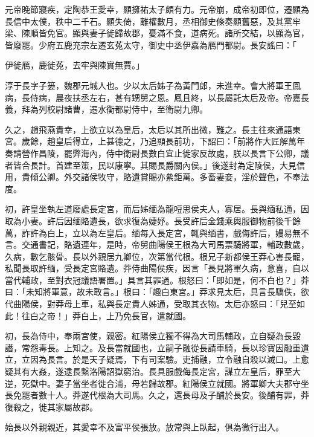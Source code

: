 \begin{pinyinscope}
元帝晚節寢疾，定陶恭王愛幸，顯擁祐太子頗有力。元帝崩，成帝初即位，遷顯為長信中太僕，秩中二千石。顯失倚，離權數月，丞相御史條奏顯舊惡，及其黨牢梁、陳順皆免官。顯與妻子徙歸故郡，憂滿不食，道病死。諸所交結，以顯為官，皆廢罷。少府五鹿充宗左遷玄菟太守，御史中丞伊嘉為鴈門都尉。長安謠曰：「

伊徙鴈，鹿徙菟，去牢與陳實無賈。」

淳于長字子篓，魏郡元城人也。少以太后姊子為黃門郎，未進幸。會大將軍王鳳病，長侍病，晨夜扶丞左右，甚有甥舅之恩。鳳且終，以長屬託太后及帝。帝嘉長義，拜為列校尉諸曹，遷水衡都尉侍中，至衛尉九卿。

久之，趙飛燕貴幸，上欲立以為皇后，太后以其所出微，難之。長主往來通語東宮。歲餘，趙皇后得立，上甚德之，乃追顯長前功，下詔曰：「前將作大匠解萬年奏請營作昌陵，罷弊海內，侍中衛尉長數白宜止徙家反故處，朕以長言下公卿，議者皆合長計。首建至策，民以康寧。其賜長爵關內侯。」後遂封為定陵侯，大見信用，貴傾公卿。外交諸侯牧守，賂遺賞賜亦絫鉅萬。多畜妻妾，淫於聲色，不奉法度。

初，許皇坐執左道廢處長定宮，而后姊缅為龍哣思侯夫人，寡居。長與缅私通，因取為小妻。許后因缅賂遺長，欲求復為婕妤。長受許后金錢乘輿服御物前後千餘萬，詐許為白上，立以為左皇后。缅每入長定宮，輒與缅書，戲侮許后，嫚易無不言。交通書記，賂遺連年，是時，帝舅曲陽侯王根為大司馬票騎將軍，輔政數歲，久病，數乞骸骨。長以外親居九卿位，次第當代根。根兄子新都侯王莽心害長寵，私聞長取許缅，受長定宮賂遺。莽侍曲陽侯疾，因言「長見將軍久病，意喜，自以當代輔政，至對衣冠議語署置。」具言其罪過。根怒曰：「即如是，何不白也？」莽曰：「未知將軍意，故未敢言。」根曰：「趣白東宮。」莽求見太后，具言長驕佚，欲代曲陽侯，對莽母上車，私與長定貴人姊通，受取其衣物。太后亦怒曰：「兒至如此！往白之帝！」莽白上，上乃免長官，遣就國。

初，長為侍中，奉兩宮使，親密。紅陽侯立獨不得為大司馬輔政，立自疑為長毀譖，常怨毒長。上知之。及長當就國也，立嗣子融從長請車騎，長以珍寶因融重遺立，立因為長言。於是天子疑焉，下有司案驗。吏捕融，立令融自殺以滅口。上愈疑其有大姦，遂逮長繫洛陽詔獄窮治。長具服戲侮長定宮，謀立左皇后，罪至大逆，死獄中。妻子當坐者徙合浦，母若歸故郡。紅陽侯立就國。將軍卿大夫郡守坐長免罷者數十人。莽遂代根為大司馬。久之，還長母及子酺於長安。後酺有罪，莽復殺之，徙其家屬故郡。

始長以外親親近，其愛幸不及富平侯張放。放常與上臥起，俱為微行出入。


\end{pinyinscope}
